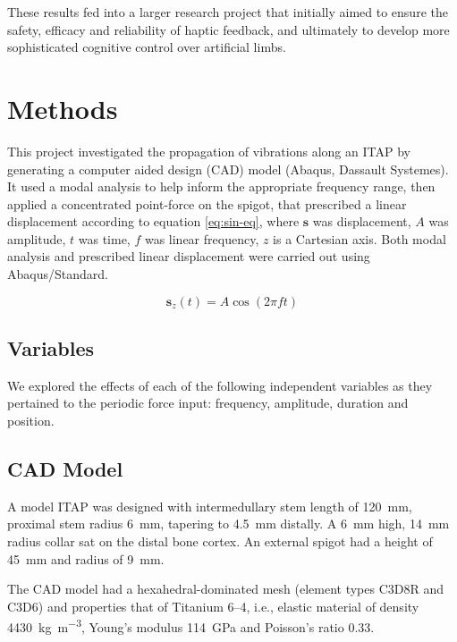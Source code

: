 These results fed into a larger research project that initially aimed to ensure the safety, efficacy and reliability of haptic feedback, and ultimately to develop more sophisticated cognitive control over artificial limbs.

\section{Methods}
This project investigated the propagation of vibrations along an ITAP by generating a computer aided design (CAD) model (Abaqus, Dassault Systemes).
It used a modal analysis to help inform the appropriate frequency range, then applied a concentrated point-force on the spigot, that prescribed a linear displacement according to equation \ref{eq:sin-eq}, where $\textbf{s}$ was displacement, $ A $ was amplitude, $t$ was time, $f$ was linear frequency, $z$ is a Cartesian axis.
Both modal analysis and prescribed linear displacement were carried out using Abaqus/Standard.

\begin{equation} \label{eq:sin-eq}
    \textbf{s}_z(t) = A\cos(2\pi f t)
\end{equation}

\subsection{Variables}
We explored the effects of each of the following independent variables as they pertained to the periodic force input: frequency, amplitude, duration and position.

\subsection{CAD Model}
A model ITAP was designed with intermedullary stem length of \SI{120}{mm}, proximal stem radius \SI{6}{mm}, tapering to \SI{4.5}{mm} distally.
A \SI{6}{mm} high, \SI{14}{mm} radius collar sat on the distal bone cortex.
An external spigot had a height of \SI{45}{mm} and radius of \SI{9}{mm}.

The CAD model had a hexahedral-dominated mesh (element types C3D8R and C3D6) and properties that of Titanium 6--4, i.e., elastic material of density \SI{4430}{\kilo\gram\per\metre\cubed}, Young's modulus \SI{114}{\giga\pascal} and Poisson's ratio 0.33.


